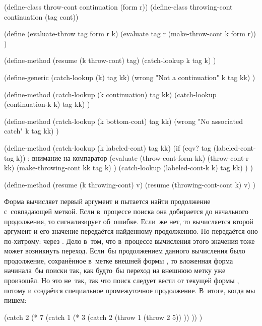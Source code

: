 \begin{code:lisp}
(define-class throw-cont    continuation (form r))
(define-class throwing-cont continuation (tag cont))

(define (evaluate-throw tag form r k)
  (evaluate tag r (make-throw-cont k form r)) )

(define-method (resume (k throw-cont) tag)
  (catch-lookup k tag k) )

(define-generic (catch-lookup (k) tag kk)
  (wrong "Not a continuation" k tag kk) )

(define-method (catch-lookup (k continuation) tag kk)
  (catch-lookup (continuation-k k) tag kk) )

(define-method (catch-lookup (k bottom-cont) tag kk)
  (wrong "No associated catch" k tag kk) )

(define-method (catch-lookup (k labeled-cont) tag kk)
  (if (eqv? tag (labeled-cont-tag k))  ; внимание на компаратор
      (evaluate (throw-cont-form kk)
                (throw-cont-r kk)
                (make-throwing-cont kk tag k) )
      (catch-lookup (labeled-cont-k k) tag kk) ) )

(define-method (resume (k throwing-cont) v)
  (resume (throwing-cont-cont k) v) )
\end{code:lisp}

Форма  вычисляет первый аргумент и пытается найти продолжение
с~совпадающей меткой. Если в~процессе поиска она добирается до начального
продолжения, то сигнализирует об~ошибке. Если~же нет, то вычисляется второй
аргумент  и его значение передаётся найденному продолжению. Но
передаётся оно по-хитрому: через . Дело в~том, что в~процессе
вычисления этого значения тоже может возникнуть переход. Если~бы продолжением
данного вычисления было продолжение, сохранённое в~метке внешней формы
, то вложенная форма  начинала~бы поиски  так, как
будто~бы переход на внешнюю метку уже произошёл. Но это не~так, так что поиск
следует вести от текущей формы , потому и создаётся специальное
промежуточное продолжение. В~итоге, когда мы пишем:

\begin{code:lisp}
(catch 2
  (* 7 (catch 1
         (* 3 (catch 2
                (throw 1 (throw 2 5)) )) )) )
\end{code:lisp}

